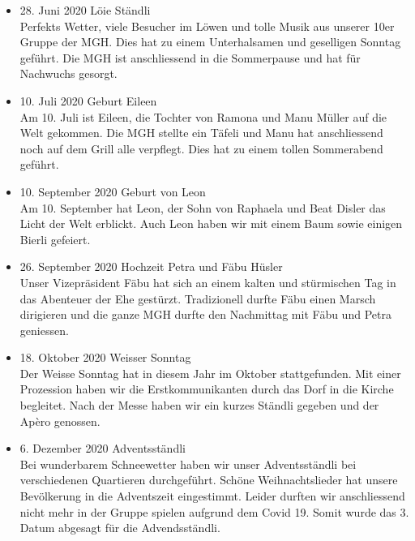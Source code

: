 \begin{history}
\begin{itemize}
            \item 28. Juni 2020 Löie Ständli\\
                  Perfekts Wetter, viele Besucher im Löwen und tolle Musik aus
                  unserer 10er Gruppe der MGH. Dies hat zu einem Unterhalsamen und
                  geselligen Sonntag geführt. Die MGH ist anschliessend in die
                  Sommerpause und hat für Nachwuchs gesorgt.

            \item 10. Juli 2020 Geburt Eileen\\
                  Am 10. Juli ist Eileen, die Tochter von Ramona und Manu Müller auf
                  die Welt gekommen. Die MGH stellte ein Täfeli und Manu hat
                  anschliessend noch auf dem Grill alle verpflegt. Dies hat zu einem
                  tollen Sommerabend geführt.

            \item 10. September 2020 Geburt von Leon\\
                  Am 10. September hat Leon, der Sohn von Raphaela und Beat Disler
                  das Licht der Welt erblickt. Auch Leon haben wir mit einem Baum
                  sowie einigen Bierli gefeiert.

            \item 26. September 2020 Hochzeit Petra und Fäbu Hüsler\\
                  Unser Vizepräsident Fäbu hat sich an einem kalten und stürmischen
                  Tag in das Abenteuer der Ehe gestürzt. Tradizionell durfte Fäbu
                  einen Marsch dirigieren und die ganze MGH durfte den Nachmittag
                  mit Fäbu und Petra geniessen.

            \item 18. Oktober 2020 Weisser Sonntag\\
                  Der Weisse Sonntag hat in diesem Jahr im Oktober stattgefunden.
                  Mit einer Prozession haben wir die Erstkommunikanten durch das
                  Dorf in die Kirche begleitet. Nach der Messe haben wir ein kurzes
                  Ständli gegeben und der Apèro genossen.

            \item 6. Dezember 2020 Adventsständli\\
                  Bei wunderbarem Schneewetter haben wir unser Adventsständli bei
                  verschiedenen Quartieren durchgeführt. Schöne Weihnachtslieder hat
                  unsere Bevölkerung in die Adventszeit eingestimmt. Leider durften
                  wir anschliessend nicht mehr in der Gruppe spielen aufgrund dem
                  Covid 19. Somit wurde das 3. Datum abgesagt für die
                  Advendsständli.


\end{itemize}
\end{history}
